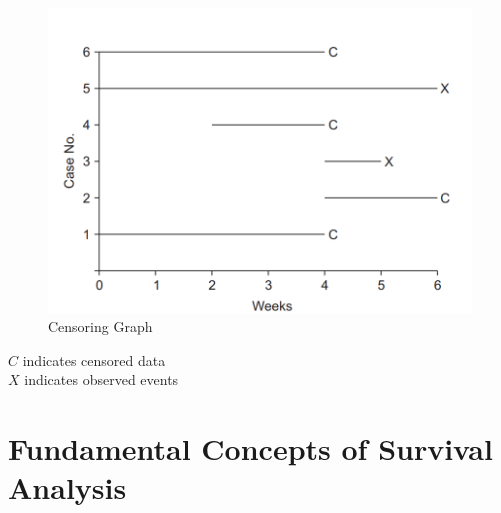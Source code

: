 \documentclass[doublespacing,12pt]{report}
\begin{document}
\begin{figure}[H]
    \centering
    \includegraphics[width=0.85\linewidth]{Figure 3/3.2.png}
    \caption{Censoring Graph}
    \label{Figure 3.2}
\end{figure}



\vspace{0.1in}
 \noindent \(C\) indicates censored data
\\ \noindent  \(X\) indicates observed events






\section{Fundamental Concepts of Survival Analysis}
\end{document}
